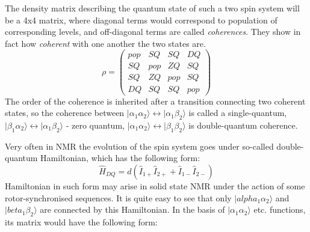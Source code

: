 \documentclass[a4paper, 12pt]{article}
\begin{document}
The density matrix describing the quantum state of such a two spin system will be a 4x4 matrix, where diagonal terms would correspond to population of corresponding levels, and off-diagonal terms are called \emph{coherences}. They show in fact how \emph{coherent} with one another the two states are. 
\begin{equation}
\rho = \left( \begin{array}{cccc} 
   pop & SQ & SQ & DQ \\
   SQ & pop & ZQ & SQ \\
   SQ & ZQ & pop & SQ \\
   DQ & SQ & SQ & pop 
   \end{array}  \right)
\end{equation} 
The order of the coherence is inherited after a transition connecting two coherent states, so the coherence between 
$\vert \alpha_1 \alpha_2  \rangle \leftrightarrow  \vert \alpha_1 \beta_2 \rangle$ is called a single-quantum, $\vert \beta_1 \alpha_2  \rangle \leftrightarrow  \vert \alpha_1 \beta_2 \rangle$ - zero quantum, $\vert \alpha_1 \alpha_2  \rangle \leftrightarrow  \vert \beta_1 \beta_2 \rangle$ is double-quantum coherence.

Very often in NMR the evolution of the spin system goes under so-called double-quantum Hamiltonian, which has the following form: 
\begin{equation}
\hat{H}_{DQ} = d (\hat{I}_{1+} \hat{I}_{2+} + \hat{I}_{1-} \hat{I}_{2-} )
\end{equation}
Hamiltonian in such form may arise  in solid state NMR under the action of some rotor-synchronised sequences. It is quite easy to see that only $\vert alpha_1 \alpha_2 \rangle$  and  $\vert beta_1 \beta_2 \rangle$ are connected by this Hamiltonian. In the basis of $\vert \alpha_1 \alpha_2 \rangle $ etc. functions, its matrix would have the following form:
\end{document}
